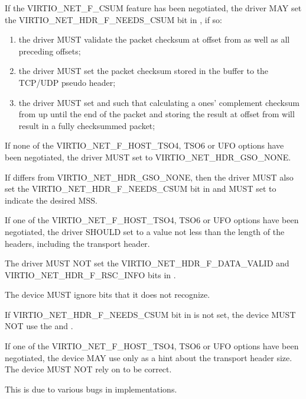 If the VIRTIO_NET_F_CSUM feature has been negotiated, the
driver MAY set the VIRTIO_NET_HDR_F_NEEDS_CSUM bit in
, if so:
\begin{enumerate}
\item the driver MUST validate the packet checksum at
	offset  from  as well as all
	preceding offsets;
\item the driver MUST set the packet checksum stored in the
	buffer to the TCP/UDP pseudo header;
\item the driver MUST set  and
	 such that calculating a ones'
	complement checksum from  up until the end of
	the packet and storing the result at offset 
	from   will result in a fully checksummed
	packet;
\end{enumerate}

If none of the VIRTIO_NET_F_HOST_TSO4, TSO6 or UFO options have
been negotiated, the driver MUST set  to
VIRTIO_NET_HDR_GSO_NONE.

If  differs from VIRTIO_NET_HDR_GSO_NONE, then
the driver MUST also set the VIRTIO_NET_HDR_F_NEEDS_CSUM bit in
 and MUST set  to indicate the
desired MSS.

If one of the VIRTIO_NET_F_HOST_TSO4, TSO6 or UFO options have
been negotiated, the driver SHOULD set  to a value
not less than the length of the headers, including the transport
header.

The driver MUST NOT set the VIRTIO_NET_HDR_F_DATA_VALID and
VIRTIO_NET_HDR_F_RSC_INFO bits in .

The device MUST ignore  bits that it does not recognize.

If VIRTIO_NET_HDR_F_NEEDS_CSUM bit in  is not set, the
device MUST NOT use the  and .

If one of the VIRTIO_NET_F_HOST_TSO4, TSO6 or UFO options have
been negotiated, the device MAY use  only as a hint about the
transport header size.
The device MUST NOT rely on  to be correct.
\begin{note}
This is due to various bugs in implementations.
\end{note}

